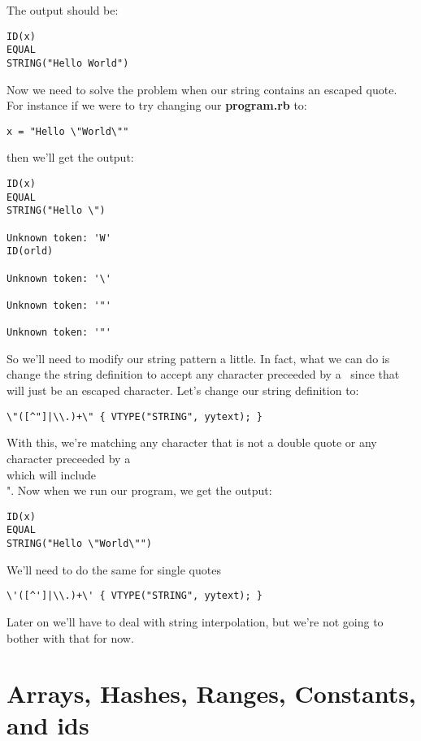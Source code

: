 {The output should be:

\begin{lstlisting}
ID(x)
EQUAL
STRING("Hello World")
\end{lstlisting}

Now we need to solve the problem when our string contains an escaped quote. For instance if we were to try changing our {\bf program.rb} to:

\begin{lstlisting}
x = "Hello \"World\""
\end{lstlisting}

then we'll get the output:

\begin{lstlisting}
ID(x)
EQUAL
STRING("Hello \")

Unknown token: 'W'
ID(orld)

Unknown token: '\'

Unknown token: '"'

Unknown token: '"'
\end{lstlisting}

So we'll need to modify our string pattern a little. In fact, what we can do is change the string definition to accept any character preceeded by a \ since that will just be an escaped character. Let's change our string definition to:

\begin{lstlisting}
\"([^"]|\\.)+\" { VTYPE("STRING", yytext); }
\end{lstlisting}

With this, we're matching any character that is not a double quote or any character preceeded by a \\ which will include \\". Now when we run our program, we get the output:

\begin{lstlisting}
ID(x)
EQUAL
STRING("Hello \"World\"")
\end{lstlisting}

We'll need to do the same for single quotes

\begin{lstlisting}
\'([^']|\\.)+\' { VTYPE("STRING", yytext); }
\end{lstlisting}

Later on we'll have to deal with string interpolation, but we're not going to bother with that for now.

\section{Arrays, Hashes, Ranges, Constants, and ids}

}
